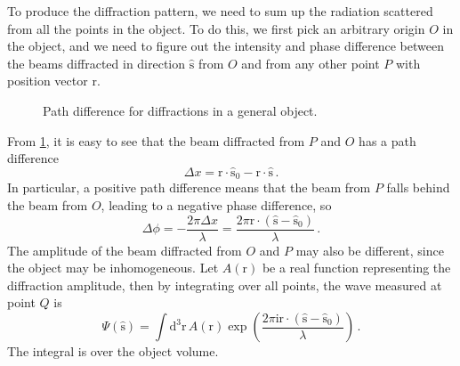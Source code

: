 \documentclass{article}
\theoremstyle{plain}\theoremheaderfont{\normalfont\itshape}\theorembodyfont{\rmfamily}\theoremseparator{.}\newtheorem*{rem}{Remark}\newtheorem*{ex}{Example}\newtheorem*{proof}{Proof}\newtheorem*{altp}{Alternative proof}
\theoremstyle{plain}\theoremheaderfont{\normalfont\bfseries}\theorembodyfont{\rmfamily}\theoremseparator{.}\newtheorem{thm}{Theorem}[section]\newtheorem{lem}[thm]{Lemma}\newtheorem{prop}[thm]{Proposition}\newtheorem*{cor}{Corollary}\newtheorem{defn}[thm]{Definition}\newtheorem{clm}[thm]{Claim}\newtheorem{clminproof}{Claim}\newtheorem*{law}{Law}\newtheorem{pos}[thm]{Postulate}
\theoremstyle{break}\theoremheaderfont{\normalfont\itshape}\theorembodyfont{\rmfamily}\theoremseparator{.\medskip}\newtheorem*{proofskip}{Proof}\newtheorem*{exs}{Examples}\newtheorem*{rems}{Remarks}
\theoremstyle{break}\theoremheaderfont{\normalfont\bfseries}\theorembodyfont{\rmfamily}\theoremseparator{.\medskip}\newtheorem{lemskip}[thm]{Lemma}\newtheorem{defnskip}[thm]{Definition}\newtheorem{propskip}[thm]{Proposition}\newtheorem{thmskip}[thm]{Theorem}
\numberwithin{equation}{section}
\newcommand{\ii}{\mathrm{i}}
\newcommand{\dd}[2][]{\mathrm{d}^{#1} #2\,}
\newcommand{\vb}[1]{\bm{\mathrm{#1}}}
\newcommand{\vu}[1]{\hat{\bm{\mathrm{#1}}}}
\newcommand{\vdot}{\,\bm{\mathrm{\cdot}}\,}
\begin{document}
    To produce the diffraction pattern, we need to sum up the radiation scattered from all the points in the object. To do this, we first pick an arbitrary origin \(O\) in the object, and we need to figure out the intensity and phase difference between the beams diffracted in direction \(\vu{s}\) from \(O\) and from any other point \(P\) with position vector \(\vb{r}\).

    \begin{figure}
        \centering
        \caption{Path difference for diffractions in a general object.}
        \label{object_diffraction}
    \end{figure}

    From \cref{object_diffraction}, it is easy to see that the beam diffracted from \(P\) and \(O\) has a path difference
    \begin{equation}
        \Delta x=\vb{r}\vdot\vu{s}_0-\vb{r}\vdot\vu{s}\,.
    \end{equation}
    In particular, a positive path difference means that the beam from \(P\) falls behind the beam from \(O\), leading to a negative phase difference, so
    \begin{equation}
        \Delta\phi=-\frac{2\pi\Delta x}{\lambda}=\frac{2\pi\vb{r}\vdot(\vu{s}-\vu{s}_0)}{\lambda}\,.
    \end{equation}
    The amplitude of the beam diffracted from \(O\) and \(P\) may also be different, since the object may be inhomogeneous. Let \(A(\vb{r})\) be a real function representing the diffraction amplitude, then by integrating over all points, the wave measured at point \(Q\) is
    \begin{equation}
        \Psi(\vu{s})=\int\dd[3]{\vb{r}}A(\vb{r})\exp\left(\frac{2\pi \ii\vb{r}\vdot(\vu{s}-\vu{s}_0)}{\lambda}\right)\,.
    \end{equation}
    The integral is over the object volume.
\end{document}
